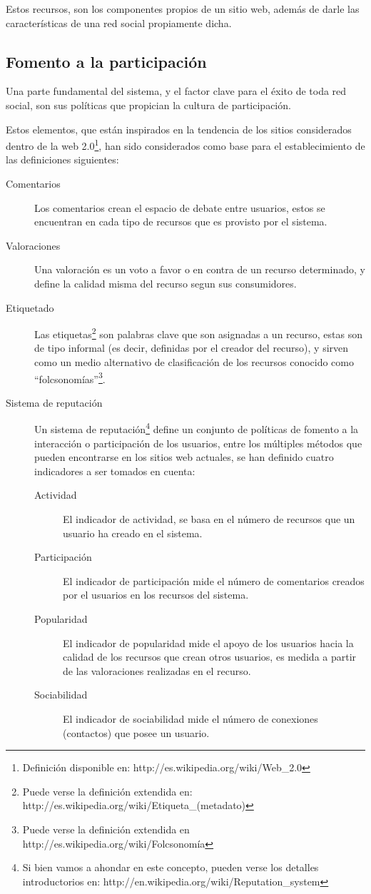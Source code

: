 Estos recursos, son los componentes propios de un sitio web, además de darle las
características de una red social propiamente dicha.

\subsection{Fomento a la participación}

Una parte fundamental del sistema, y el factor clave para el éxito de toda red
social, son sus políticas que propician la cultura de participación.

Estos elementos, que están inspirados en la tendencia de los sitios considerados
dentro de la web 2.0\footnote{Definición disponible en:
http://es.wikipedia.org/wiki/Web\_2.0}, han sido considerados como base para el
establecimiento de las definiciones siguientes:

\begin{description}
\item [Comentarios] Los comentarios crean el espacio de debate entre usuarios,
estos se encuentran en cada tipo de recursos que es provisto por el sistema.
\item [Valoraciones] Una valoración es un voto a favor o en contra de un recurso
determinado, y define la calidad misma del recurso segun sus consumidores.
\item [Etiquetado] Las etiquetas\footnote{Puede verse la definición extendida
en: http://es.wikipedia.org/wiki/Etiqueta\_(metadato)} son palabras clave que
son asignadas a un recurso, estas son de tipo informal (es decir, definidas por
el creador del recurso), y sirven como un medio alternativo de clasificación de
los recursos conocido como ``folcsonomías''\footnote{Puede verse la definición
extendida en http://es.wikipedia.org/wiki/Folcsonomía}.
\item [Sistema de reputación] Un sistema de reputación\footnote{Si bien vamos a
ahondar en este concepto, pueden verse los detalles introductorios en:
http://en.wikipedia.org/wiki/Reputation\_system} define un conjunto de políticas
de fomento a la interacción o participación de los usuarios, entre los múltiples
métodos que pueden encontrarse en los sitios web actuales, se han definido
cuatro indicadores a ser tomados en cuenta:
\begin{description}
    \item [Actividad] El indicador de actividad, se basa en el número de
    recursos que un usuario ha creado en el sistema.
    \item [Participación] El indicador de participación mide el número de
    comentarios creados por el usuarios en los recursos del sistema.
    \item [Popularidad] El indicador de popularidad mide el apoyo de los
    usuarios hacia la calidad de los recursos que crean otros usuarios, es
    medida a partir de las valoraciones realizadas en el recurso.
    \item [Sociabilidad] El indicador de sociabilidad mide el número de
    conexiones (contactos) que posee un usuario.
    \end{description}
\end{description}

